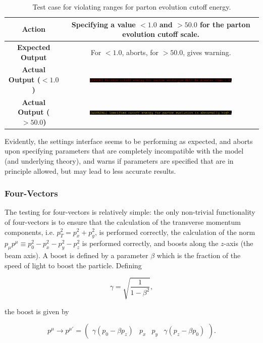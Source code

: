 \begin{table}[ht]
  \centering
  \begin{tabular}{|c|c|}
    \hline
    \textbf{Action} & Specifying a value $<1.0$ and $>50.0$ for the parton evolution cutoff scale. \\ \hline
    \textbf{Expected Output} & For $<1.0$, aborts, for $>50.0$, gives warning. \\ \hline
    \textbf{Actual Output ($<1.0$)} & \includegraphics[width=0.75\textwidth]{./res/gfx/settings-test2a.png} \\ \hline
    \textbf{Actual Output ($>50.0$)} & \includegraphics[width=0.75\textwidth]{./res/gfx/settings-test2b.png} \\ \hline
  \end{tabular}
  \caption{Test case for violating ranges for parton evolution cutoff energy.}
  \label{tbl:settings-test2}
\end{table}

Evidently, the settings interface seems to be performing as expected, and aborts upon specifying parameters that are completely incompatible with the model (and underlying theory), and warns if parameters are specified that are in principle allowed, but may lead to less accurate results.


\subsubsection{Four-Vectors}

The testing for four-vectors is relatively simple: the only non-trivial functionality of four-vectors is to ensure that the calculation of the transverse momentum components, i.e. $p_T^2 = p_x^2 + p_y^2$, is performed correctly, the calculation of the norm $p_\mu p^\mu \equiv p_0^2 - p_x^2 - p_y^2 - p_z^2$ is performed correctly, and boosts along the $z$-axis (the beam axis). A boost is defined by a parameter $\beta$ which is the fraction of the speed of light to boost the particle. Defining

\begin{equation}
  \gamma = \sqrt{\frac{1}{1-\beta^2}},
\end{equation}

the boost is given by

\begin{equation}
  p^\mu \rightarrow p^{\mu\prime} = \begin{pmatrix}\gamma (p_0 - \beta p_z) & p_x & p_y & \gamma(p_z - \beta p_0)\end{pmatrix}.
\end{equation}

